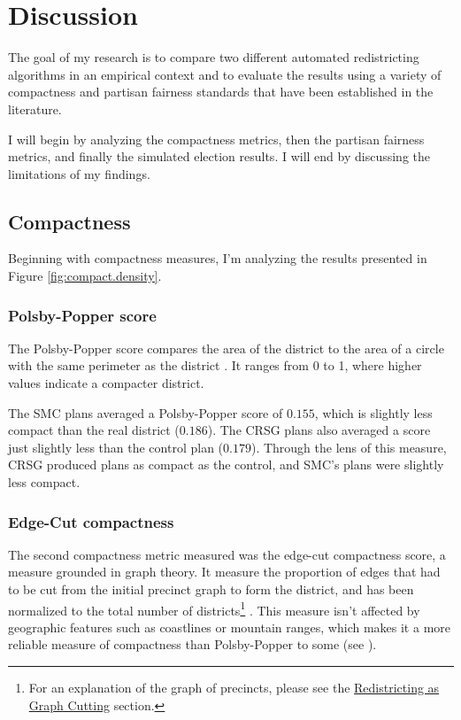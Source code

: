 \section{Discussion}
\label{sec:disc}

The goal of my research is to compare two different automated redistricting algorithms in an empirical context and to evaluate the results using a variety of compactness and partisan fairness standards that have been established in the literature. 

I will begin by analyzing the compactness metrics, then the partisan fairness metrics, and finally the simulated election results. I will end by discussing the limitations of my findings. 

\subsection{Compactness}

Beginning with compactness measures, I'm analyzing the results presented in Figure \ref{fig:compact.density}. 

\subsubsection{Polsby-Popper score}

The Polsby-Popper score compares the area of the district to the area of a circle with the same perimeter as the district \parencite{polsby1991}. It ranges from 0 to 1, where higher values indicate a compacter district. 

The SMC plans averaged a Polsby-Popper score of $0.155$, which is slightly less compact than the real district ($0.186$). The CRSG plans also averaged a score just slightly less than the control plan ($0.179$). Through the lens of this measure, CRSG produced plans as compact as the control, and SMC's plans were slightly less compact. 

\subsubsection{Edge-Cut compactness}

The second compactness metric measured was the edge-cut compactness score, a measure grounded in graph theory. It measure the proportion of edges that had to be cut from the initial precinct graph to form the district, and has been normalized to the total number of districts\footnote{For an explanation of the graph of precincts, please see the \hyperref[sec:redistasgraphcut]{Redistricting as Graph Cutting} section.} \parencite{dube2016}. This measure isn't affected by geographic features such as coastlines or mountain ranges, which makes it a more reliable measure of compactness than Polsby-Popper to some (see \textcite{mccartan2020}). 


